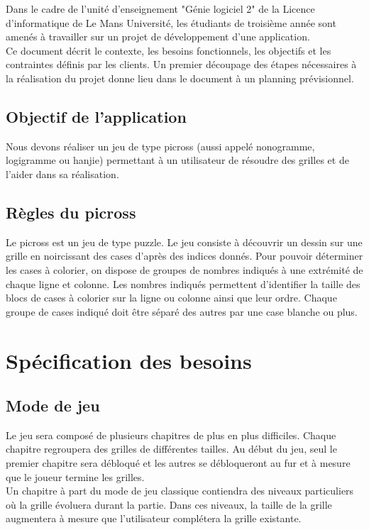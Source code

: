 \documentclass{report}
\begin{document}
		Dans le cadre de l'unité d'enseignement "Génie logiciel 2" de la Licence d'informatique de Le Mans Université, les étudiants de troisième année sont amenés à travailler sur un projet de développement d'une application. \\
		Ce document décrit le contexte, les besoins fonctionnels, les objectifs et les contraintes définis par les clients. Un premier découpage des étapes nécessaires à la réalisation du projet donne lieu dans le document à un planning prévisionnel.

	
  \section{Objectif de l'application}		
		Nous devons réaliser un jeu de type picross (aussi appelé nonogramme, logigramme ou hanjie) permettant à un utilisateur de résoudre des grilles et de l'aider dans sa réalisation.

	\section{Règles du picross}
		Le picross est un jeu de type puzzle. Le jeu consiste à découvrir un dessin sur une grille en noircissant des cases d'après des indices donnés.	
		Pour pouvoir déterminer les cases à colorier, on dispose de groupes de nombres indiqués à une extrémité de chaque ligne et colonne.
		\newline
		Les nombres indiqués permettent d'identifier la taille des blocs de cases à colorier sur la ligne ou colonne ainsi que leur ordre.
		\newline
		Chaque groupe de cases indiqué doit être séparé des autres par une case blanche ou plus.
	
		
\chapter{Spécification des besoins}

	\section{Mode de jeu}
			Le jeu sera composé de plusieurs chapitres de plus en plus difficiles. Chaque chapitre regroupera des grilles de différentes tailles. Au début du jeu, seul le premier chapitre sera débloqué et les autres se débloqueront au fur et à mesure que le joueur termine les grilles.\\
			Un chapitre à part du mode de jeu classique contiendra des niveaux particuliers où la grille évoluera durant la partie. Dans ces niveaux, la taille de la grille augmentera à mesure que l'utilisateur complétera la grille existante.
\end{document}
